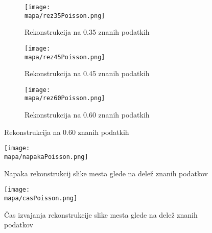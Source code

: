 \renewcommand{\mapa}{Poglavja/Slike/kompleksnost/kompleksna grayscale 300}

\begin{figure}[h]
    \begin{subfigure}{0.32\linewidth}
        \texttt{[image: \\mapa/rez35Poisson.png]}
        \caption{Rekonstrukcija na 0.35 znanih podatkih}
    \end{subfigure}
    \hfill
    \begin{subfigure}{0.32\linewidth}
        \texttt{[image: \\mapa/rez45Poisson.png]}
        \caption{Rekonstrukcija na 0.45 znanih podatkih}
    \end{subfigure}
    \hfill
    \begin{subfigure}{0.32\linewidth}
        \texttt{[image: \\mapa/rez60Poisson.png]}
        \caption{Rekonstrukcija na 0.60 znanih podatkih}
    \end{subfigure}
\end{figure}

\begin{figure}[h]
    \texttt{[image: \\mapa/napakaPoisson.png]}
    \caption{Napaka rekonstrukcij slike mesta glede na delež znanih podatkov}
\end{figure}

\begin{figure}[h]
    \texttt{[image: \\mapa/casPoisson.png]}
    \caption{Čas izvajanja rekonstrukcije slike mesta glede na delež znanih podatkov}
\end{figure} 
